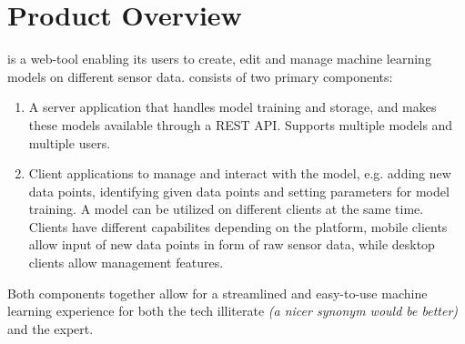 \section{Product Overview}

 {\pseProjectName} is a web-tool enabling its users to create, edit and manage machine learning models on different sensor data. {\pseProjectName} consists of two primary components:

\begin{enumerate}
    \item A server application that handles model training and storage, and makes these models available through a REST API. Supports multiple models and multiple users.
    \item Client applications to manage and interact with the model, e.g. adding new data points, identifying given data points and setting parameters for model training. A model can be utilized on different clients at the same time. Clients have different capabilites depending on the platform, mobile clients allow input of new data points in form of raw sensor data, while desktop clients allow management features.
\end{enumerate}

Both components together allow for a streamlined and easy-to-use machine learning experience for both the tech illiterate
\emph{(a nicer synonym would be better)} and the expert.
